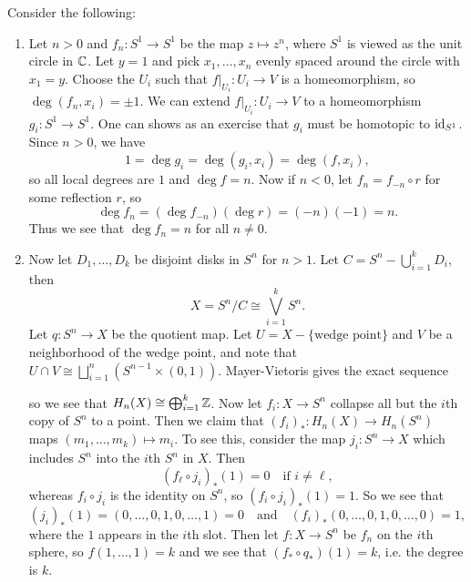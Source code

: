 \begin{example}
  Consider the following:
  \begin{enumerate}
    \item Let $n > 0$ and $f_n : S^1 \to S^1$
      be the map $z \mapsto z^n$, where $S^1$ is viewed
      as the unit circle in $\mathbb{C}$. Let $y = 1$ and
      pick $x_1, \dots, x_n$ evenly spaced around the
      circle with $x_1 = y$. Choose the $U_i$
      such that $f|_{U_i} : U_i \to V$ is a
      homeomorphism, so $\deg(f_n, x_i) = \pm 1$.
      We can extend $f|_{U_i} : U_i \to V$ to a
      homeomorphism $g_i : S^1 \to S^1$. One can
      shows as an exercise that $g_i$ must be homotopic
      to $\operatorname{id}_{S^1}$. Since $n > 0$, we have
      \[
        1 = \deg g_i = \deg(g_i, x_i) = \deg(f, x_i),
      \]
      so all local degrees are $1$ and $\deg f = n$.
      Now if $n < 0$, let $f_n = f_{-n} \circ r$ for
      some reflection $r$, so
      \[\deg f_n = (\deg f_{-n}) (\deg r) = (-n) (-1) = n.\]
      Thus we see that $\deg f_n = n$ for all $n \ne 0$.
    \item Now let $D_1, \dots, D_k$ be disjoint disks
      in $S^n$ for $n > 1$. Let $C = S^n - \bigcup_{i = 1}^k D_i$, then
      \[
        X = S^n / C \cong \bigvee_{i = 1}^k S^n.
      \]
      Let $q : S^n \to X$ be the quotient map.
      Let $U = X - \{\text{wedge point}\}$ and
      $V$ be a neighborhood of the wedge point, and
      note that $U \cap V \cong \bigsqcup_{i = 1}^n (S^{n - 1} \times (0, 1))$.
      Mayer-Vietoris gives the exact sequence
      \begin{center}
      \end{center}
      so we see that $H_n(X) \cong \bigoplus_{i = 1}^k \mathbb{Z}$.
      Now let $f_i : X \to S^n$ collapse all but the
      $i$th copy of $S^n$ to a point. Then we claim that
      $(f_i)_* : H_n(X) \to H_n(S^n)$ maps
      $(m_1, \dots, m_k) \mapsto m_i$. To see this,
      consider the map
      $j_i : S^n \to X$ which includes $S^n$ into the
      $i$th $S^n$ in $X$. Then
      \[
        (f_\ell \circ j_i)_*(1) = 0 \quad \text{if $i \ne \ell$},
      \]
      whereas $f_i \circ j_i$ is the identity on
      $S^n$, so $(f_i \circ j_i)_*(1) = 1$. So we
      see that
      \[
        (j_i)_*(1) = (0, \dots, 0, 1, 0, \dots, 1)
        = 0 \quad \text{and} \quad
        (f_i)_*(0, \dots, 0, 1, 0, \dots, 0) = 1,
      \]
      where the $1$ appears in the $i$th slot.
      Then let $f : X \to S^n$ be $f_n$ on the $i$th
      sphere, so $f(1, \dots, 1) = k$
      and we see that $(f_* \circ q_*)(1) = k$, i.e.
      the degree is $k$.
  \end{enumerate}
\end{example}
